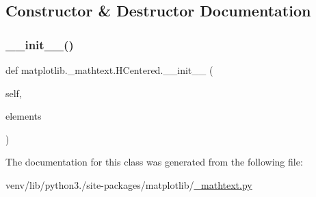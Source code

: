 \subsection{Constructor \& Destructor Documentation}
\mbox{\label{classmatplotlib_1_1__mathtext_1_1HCentered_a7485f1fcd6e560851576445c64633e37}} 
\subsubsection{\texorpdfstring{\+\_\+\+\_\+init\+\_\+\+\_\+()}{\_\_init\_\_()}}
{\footnotesize\ttfamily def matplotlib.\+\_\+mathtext.\+H\+Centered.\+\_\+\+\_\+init\+\_\+\+\_\+ (\begin{DoxyParamCaption}\item[{}]{self,  }\item[{}]{elements }\end{DoxyParamCaption})}



The documentation for this class was generated from the following file\+:\begin{DoxyCompactItemize}
\item 
venv/lib/python3./site-\/packages/matplotlib/\hyperlink{__mathtext_8py}{\+\_\+mathtext.\+py}\end{DoxyCompactItemize}
